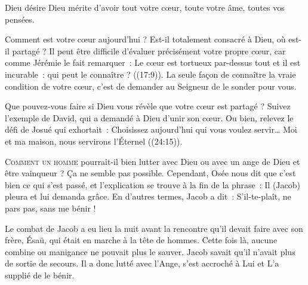 Dieu désire \ocadr Dieu mérite \fcadr{} d'avoir tout votre cœur,
 toute votre âme, toutes vos pensées. 

Comment est votre cœur aujourd'hui ? Est-il totalement consacré à Dieu,
 où est-il partagé ? Il peut être difficile d'évaluer précisément
 votre propre cœur, car comme Jérémie le fait remarquer~:
 \og Le cœur est tortueux par-dessus tout et il est incurable~:
 qui peut le connaître ? \fg{} ((17:9)).
 La seule façon de connaître la vraie condition de votre cœur,
 c'est de demander au Seigneur de le sonder pour vous. 

Que pouvez-vous faire si Dieu vous révèle que votre cœur est partagé ?
 Suivez l'exemple de David, qui a demandé à Dieu d'unir son cœur.
 Ou bien, relevez le défi de Josué qui exhortait~: 
 \og Choisissez aujourd'hui qui vous voulez servir\dots{}
 Moi et ma maison, nous servirons l'Éternel  \fg{}
 ((24:15)). 

\dvrule






\lettrine{C}{omment un homme} pourrait-il bien lutter avec Dieu
 \ocadr ou avec un ange de Dieu \fcadr{} et être vainqueur ?
 Ça ne semble pas possible.
 Cependant, Osée nous dit que c'est bien ce qui s'est passé,
 et l'explication se trouve à la fin de la phrase~:
 \og Il (Jacob) pleura et lui demanda grâce. \fg{}
 En d'autres termes, Jacob a dit~: 
 \og S'il-te-plaît, ne pars pas, sans me bénir ! \fg{}

Le combat de Jacob a eu lieu la nuit avant la rencontre qu'il devait
 faire avec son frère, Ésaü, qui était en marche à la tête de  hommes.
 Cette fois là, aucune combine ou manigance ne pouvait plus le sauver.
 Jacob savait qu'il n'avait plus de sortie de secours.
 Il a donc lutté avec l'Ange, s'est accroché à Lui et L'a supplié de le bénir. 


